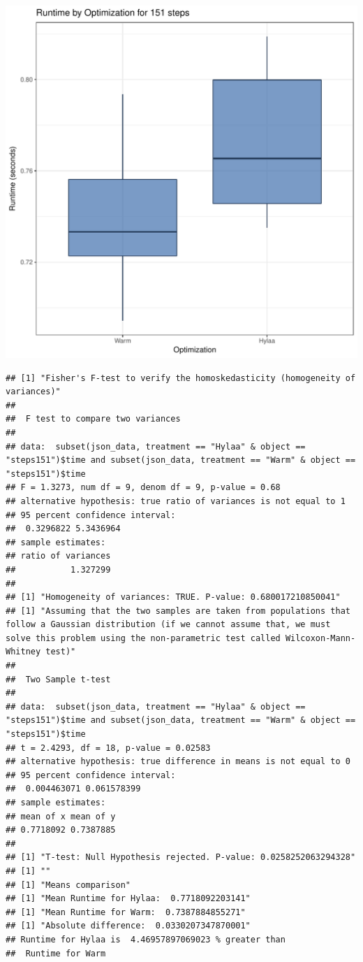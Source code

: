 \documentclass{article}\usepackage[]{graphicx}\usepackage[]{color}
\makeatletter
\def\maxwidth{ %
  \ifdim\Gin@nat@width>\linewidth
    \linewidth
  \else
    \Gin@nat@width
  \fi
}
\newenvironment{kframe}{%
 \def\at@end@of@kframe{}%
 \ifinner\ifhmode%
  \def\at@end@of@kframe{\end{minipage}}%
  \begin{minipage}{\columnwidth}%
 \fi\fi%
 \def\FrameCommand##1{\hskip\@totalleftmargin \hskip-\fboxsep
 \colorbox{shadecolor}{##1}\hskip-\fboxsep
     \hskip-\linewidth \hskip-\@totalleftmargin \hskip\columnwidth}%
 \MakeFramed {\advance\hsize-\width
   \@totalleftmargin\z@ \linewidth\hsize
   \@setminipage}}%
 {\par\unskip\endMakeFramed%
 \at@end@of@kframe}
\newenvironment{knitrout}{}{} %
\makeatother
\begin{document}
\begin{knitrout}
\color{fgcolor}
\includegraphics[width=\maxwidth]{figure/RH1_steps151-1} 
\begin{kframe}\begin{verbatim}
## [1] "Fisher's F-test to verify the homoskedasticity (homogeneity of variances)"
## 
## 	F test to compare two variances
## 
## data:  subset(json_data, treatment == "Hylaa" & object == "steps151")$time and subset(json_data, treatment == "Warm" & object == "steps151")$time
## F = 1.3273, num df = 9, denom df = 9, p-value = 0.68
## alternative hypothesis: true ratio of variances is not equal to 1
## 95 percent confidence interval:
##  0.3296822 5.3436964
## sample estimates:
## ratio of variances 
##           1.327299 
## 
## [1] "Homogeneity of variances: TRUE. P-value: 0.680017210850041"
## [1] "Assuming that the two samples are taken from populations that follow a Gaussian distribution (if we cannot assume that, we must solve this problem using the non-parametric test called Wilcoxon-Mann-Whitney test)"
## 
## 	Two Sample t-test
## 
## data:  subset(json_data, treatment == "Hylaa" & object == "steps151")$time and subset(json_data, treatment == "Warm" & object == "steps151")$time
## t = 2.4293, df = 18, p-value = 0.02583
## alternative hypothesis: true difference in means is not equal to 0
## 95 percent confidence interval:
##  0.004463071 0.061578399
## sample estimates:
## mean of x mean of y 
## 0.7718092 0.7387885 
## 
## [1] "T-test: Null Hypothesis rejected. P-value: 0.0258252063294328"
## [1] ""
## [1] "Means comparison"
## [1] "Mean Runtime for Hylaa:  0.7718092203141"
## [1] "Mean Runtime for Warm:  0.7387884855271"
## [1] "Absolute difference:  0.0330207347870001"
## Runtime for Hylaa is  4.46957897069023 % greater than 
##  Runtime for Warm
\end{verbatim}
\end{kframe}
\end{knitrout}
\end{document}
